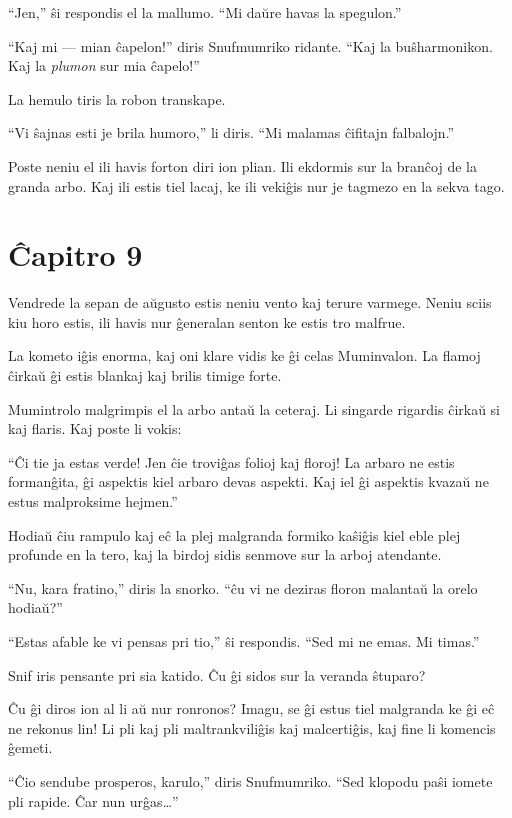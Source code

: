``Jen,'' ŝi respondis el la mallumo. ``Mi daŭre havas la spegulon.''

``Kaj mi --- mian ĉapelon!'' diris Snufmumriko ridante. ``Kaj la buŝharmonikon. Kaj la \emph{plumon} sur mia ĉapelo!''

La hemulo tiris la robon transkape.

``Vi ŝajnas esti je brila humoro,'' li diris. ``Mi malamas ĉifitajn falbalojn.''

Poste neniu el ili havis forton diri ion plian. Ili ekdormis sur la branĉoj de la granda arbo. Kaj ili estis tiel lacaj, ke ili vekiĝis nur je tagmezo en la sekva tago.

\chapter*[Ĉapitro 9]{Ĉapitro 9}


Vendrede la sepan de aŭgusto estis neniu vento kaj terure varmege. Neniu sciis kiu horo estis, ili havis nur ĝeneralan senton ke estis tro malfrue.

La kometo iĝis enorma, kaj oni klare vidis ke ĝi celas Muminvalon. La flamoj ĉirkaŭ ĝi estis blankaj kaj brilis timige forte.

Mumintrolo malgrimpis el la arbo antaŭ la ceteraj. Li singarde rigardis ĉirkaŭ si kaj flaris. Kaj poste li vokis:

``Ĉi tie ja estas verde! Jen ĉie troviĝas folioj kaj floroj! La arbaro ne estis formanĝita, ĝi aspektis kiel arbaro devas aspekti. Kaj iel ĝi aspektis kvazaŭ ne estus malproksime hejmen.''

Hodiaŭ ĉiu rampulo kaj eĉ la plej malgranda formiko kaŝiĝis kiel eble plej profunde en la tero, kaj la birdoj sidis senmove sur la arboj atendante.

``Nu, kara fratino,'' diris la snorko. ``ĉu vi ne deziras floron malantaŭ la orelo hodiaŭ?''

``Estas afable ke vi pensas pri tio,'' ŝi respondis. ``Sed mi ne emas. Mi timas.''

Snif iris pensante pri sia katido. Ĉu ĝi sidos sur la veranda ŝtuparo?

Ĉu ĝi diros ion al li aŭ nur ronronos? Imagu, se ĝi estus tiel malgranda ke ĝi eĉ ne rekonus lin! Li pli kaj pli maltrankviliĝis kaj malcertiĝis, kaj fine li komencis ĝemeti.

``Ĉio sendube prosperos, karulo,'' diris Snufmumriko. ``Sed klopodu paŝi iomete pli rapide. Ĉar nun urĝas{\ldots}''

